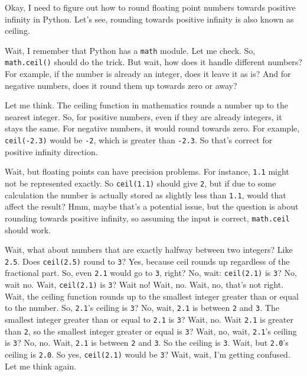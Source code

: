 Okay, I need to figure out how to round floating point numbers towards positive infinity in Python.
Let's see, rounding towards positive infinity is also known as ceiling.
{}\smallskip

Wait, I remember that Python has a \texttt{math} module.
Let me check.
{}
So, \texttt{math.ceil()} should do the trick.
But wait, how does it handle different numbers?
For example, if the number is already an integer, does it leave it as is?
And for negative numbers, does it round them up towards zero or away?\smallskip

Let me think.
The ceiling function in mathematics rounds a number up to the nearest integer.
So, for positive numbers, even if they are already integers, it stays the same.
For negative numbers, it would round towards zero.
For example, \texttt{ceil(-2.3)} would be \texttt{-2}, which is greater than \texttt{-2.3}.
So that's correct for positive infinity direction.\smallskip

{}
Wait, but floating points can have precision problems.
For instance, \texttt{1.1} might not be represented exactly.
So \texttt{ceil(1.1)} should give \texttt{2}, but if due to some calculation the number is actually stored as slightly less than \texttt{1.1}, would that affect the result?
Hmm, maybe that's a potential issue, but the question is about rounding towards positive infinity, so assuming the input is correct, \texttt{math.ceil} should work.\smallskip

Wait, what about numbers that are exactly halfway between two integers?
Like \texttt{2.5}.
Does \texttt{ceil(2.5)} round to \texttt{3}? Yes, because ceil rounds up regardless of the fractional part.
So, even \texttt{2.1} would go to \texttt{3}, right?
No, wait: \texttt{ceil(2.1)} is \texttt{3}?
No, wait no.
Wait, \texttt{ceil(2.1)} is \texttt{3}?
Wait no!
Wait, no.
Wait, no, that's not right.
Wait, the ceiling function rounds up to the smallest integer greater than or equal to the number.
So, \texttt{2.1}'s ceiling is \texttt{3}?
No, wait, \texttt{2.1} is between \texttt{2} and \texttt{3}.
The smallest integer greater than or equal to \texttt{2.1} is \texttt{3}?
Wait, no.
Wait \texttt{2.1} is greater than \texttt{2}, so the smallest integer greater or equal is \texttt{3}?
Wait, no, wait, \texttt{2.1}'s ceiling is \texttt{3}?
No, no.
Wait, \texttt{2.1} is between \texttt{2} and \texttt{3}.
So the ceiling is \texttt{3}.
Wait, but \texttt{2.0}'s ceiling is \texttt{2.0}.
So yes, \texttt{ceil(2.1)} would be \texttt{3}?
Wait, wait, I'm getting confused.
Let me think again.\smallskip

